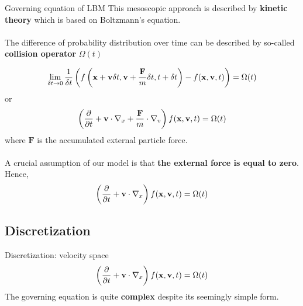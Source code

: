 \documentclass[9pt]{beamer}
\begin{document}
\begin{frame}[t]{Governing equation of LBM}
This mesoscopic approach is described by \textbf{kinetic theory} which is based on Boltzmann's equation. \\~\\
The difference of  probability distribution over time can be described by so-called \textbf{collision operator} $\Omega(t)$

\begin{equation*}
\lim_{\delta t \to 0} \frac{1}{\delta t}\left( f\left({\bf x} + {\bf v}\delta t, {\bf v} + \frac{\bf F}{m}\delta t, t + \delta t\right) - f({\bf x}, {\bf v}, t) \right) = \Omega(t)
\end{equation*}
or
\begin{equation*}
\left( \frac{\partial}{\partial t}
      + {\bf v}\cdot\nabla_x
      + \frac{\bf F}{m}\cdot\nabla_v \right)f({\bf x}, {\bf v}, t) = \Omega(t)
\end{equation*}
where $\textbf{F}$ is the accumulated external particle force. \\~\\

A crucial assumption of our model is that \textbf{the external force is equal to zero}. Hence,
\begin{equation*}
\left( \frac{\partial}{\partial t}
      + {\bf v}\cdot\nabla_x\right)f({\bf x}, {\bf v}, t) = \Omega(t)
\end{equation*}
\end{frame}
\subsection{Discretization}
\begin{frame}[t]{Discretization: velocity space}
\begin{equation*}
\left( \frac{\partial}{\partial t}
      + {\bf v}\cdot\nabla_x\right)f({\bf x}, {\bf v}, t) = \Omega(t)
\end{equation*}
The governing equation is quite \textbf{complex} despite its seemingly simple form. \\~\\
\end{frame}
\end{document}
